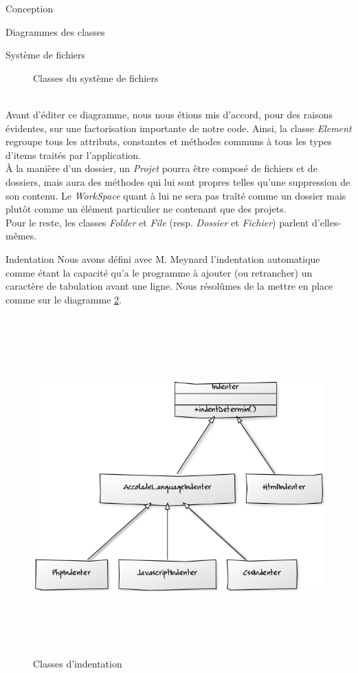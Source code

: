 \documentclass[a4paper, 12pt]{report}
\begin{document}
\begin{part}{Conception}
\begin{chapter}{Diagrammes des classes}
\begin{section}{Système de fichiers}
\begin{figure}[ht]
\begin{center}
						\caption{Classes du système de fichiers}
						\label{arbo}
					\end{center}
				\end{figure}~\\
				Avant d'éditer ce diagramme, nous nous étions mis d'accord, pour des raisons évidentes, sur une factorisation importante de 
				notre code. Ainsi, la classe \emph{Element} regroupe tous les attributs, constantes et méthodes communs à tous les types d'items 
				traités par l'application.\\
				À la manière d'un dossier, un \emph{Projet} pourra être composé de fichiers et de dossiers,
				mais aura des méthodes qui lui sont propres	telles qu'une suppression de son contenu.
				Le \emph{WorkSpace} quant à lui ne sera pas traîté comme un dossier mais plutôt comme un élément particulier ne contenant
				que des projets.\\
				Pour le reste, les classes \emph{Folder} et \emph{File} (resp. \emph{Dossier} et \emph{Fichier}) parlent d'elles-mêmes.
			\end{section}
			\begin{section}{Indentation}
				Nous avons défini avec M. Meynard l'indentation automatique comme étant la capacité qu'a le programme à ajouter (ou retrancher)
				un caractère de tabulation avant une ligne. Nous résolûmes de la mettre en place comme sur le diagramme \ref{guitare}.
				\begin{figure}[ht]
					\begin{center}
						\includegraphics[height=13cm]{images/classesIndentation.png}
						\caption{Classes d'indentation}
						\label{guitare}
					\end{center}
				\end{figure}~\\


\end{section}
\end{chapter}
\end{part}
\end{document}
